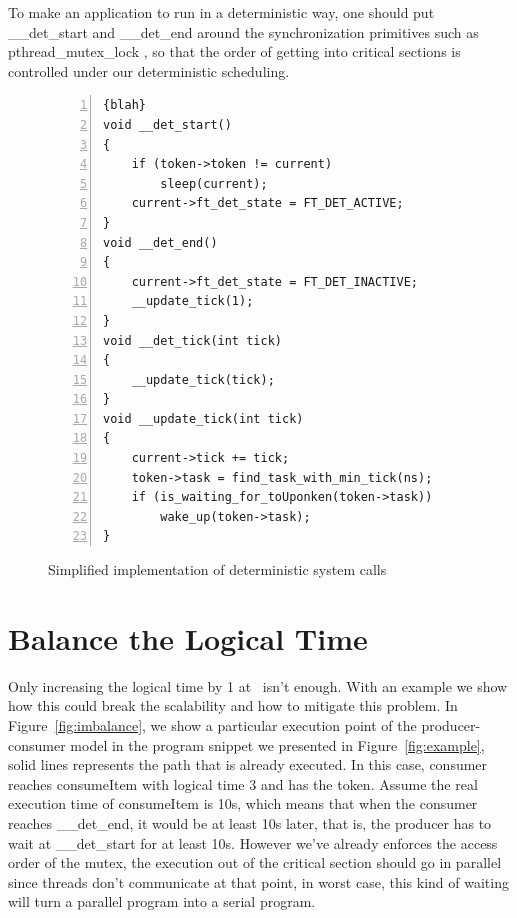 To make an application to run in a deterministic way, one should put \_\_det\_start and \_\_det\_end around the synchronization primitives such as pthread\_mutex\_lock , so that the order of getting into critical sections is controlled under our deterministic scheduling.

\begin{figure}
\begin{lstlisting}[numbers=left, frame=single, basicstyle=\small, breaklines]{blah}
void __det_start()
{
    if (token->token != current)
        sleep(current);
    current->ft_det_state = FT_DET_ACTIVE;        
}
void __det_end()
{
    current->ft_det_state = FT_DET_INACTIVE;
    __update_tick(1);
}
void __det_tick(int tick)
{
    __update_tick(tick);
}
void __update_tick(int tick)
{
    current->tick += tick;
    token->task = find_task_with_min_tick(ns);
    if (is_waiting_for_toUponken(token->task))
    	wake_up(token->task);
}
\end{lstlisting}
\caption{Simplified implementation of deterministic system calls}
\label{f:algorithm}
\end{figure}

\newpage
\section{Balance the Logical Time} \label{sec:logimbalance}
Only increasing the logical time by 1 at \detend\ isn't enough. With an example we show how this could break the scalability and how to mitigate this problem. In Figure~\ref{fig:imbalance}, we show a particular execution point of the producer-consumer model in the program snippet we presented in Figure~\ref{fig:example}, solid lines represents the path that is already executed. In this case, consumer reaches consumeItem with logical time 3 and has the token. Assume the real execution time of consumeItem is 10s, which means that when the consumer reaches \_\_det\_end, it would be at least 10s later, that is, the producer has to wait at \_\_det\_start for at least 10s. However we've already enforces the access order of the mutex, the execution out of the critical section should go in parallel since threads don't communicate at that point, in worst case, this kind of waiting will turn a parallel program into a serial program.

